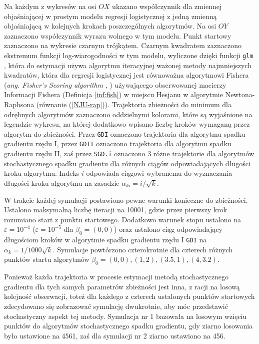 Na każdym z wykresów na osi $OX$ ukazano współczynnik dla zmiennej objaśniającej w prostym modelu regresji logistycznej z jedną zmienną objaśniającą w kolejnych krokach poszczególnych algorytmów. Na osi $OY$ zaznaczono współczynnik wyrazu wolnego w tym modelu. Punkt startowy zaznaczono na wykresie czarnym trójkątem. Czarnym kwadratem zaznaczono ekstremum funkcji log-wiarogodności w tym modelu, wyliczone dzięki funkcji \texttt{glm} \cite{glmglm}, która do estymacji używa algorytmu iteracyjnej ważonej metody najmniejszych kwadratów, która dla regresji logistycznej jest równoważna algorytmowi Fishera (\textit{ang. Fisher's Scoring algorithm} \cite{scoring1}, \cite{scoring2}) używającego obserwowanej macierzy Informacji Fishera (Definicja \ref{inf:fish}) w miejscu Hesjanu w algorytmie Newtona-Raphsona (równanie (\ref{NJU-rap})). Trajektoria zbieżności do minimum dla odrębnych algorytmów zaznaczono oddzielnymi kolorami, które są wyjaśnione na legendzie wykresu, na której dodatkowo wpisano liczbę kroków wymaganą przez algorytm do zbieżności. Przez \texttt{GDI} oznaczono trajektoria dla algorytmu spadku gradientu rzędu I, przez \texttt{GDII} oznaczono trajektoria dla algorytmu spadku gradientu rzędu II, zaś przez \texttt{SGD.i} oznaczono 3 różne trajektorie dla algorytmów stochastycznego spadku gradientu dla różnych ciągów odpowiadających długości kroku algorytmu. Indeks $i$ odpowiada ciągowi wybranemu do wyznaczania długości kroku algorytmu na zasadzie $\alpha_{ki} = i/\sqrt{k}$.

W trakcie każdej symulacji postawiono pewne warunki konieczne do zbieżności. Ustalono maksymalną liczbę iteracji na 10001, gdzie przez pierwszy krok rozumiano start z punktu startowego. Dodatkowo warunek stopu ustalono na $\varepsilon=10^{-4}$ ($\varepsilon=10^{-5}$ dla $\beta_0 = (0,0)$) oraz ustalono ciąg odpowiadający długościom kroków w algorytmie spadku gradientu rzędu I \texttt{GDI} na $\alpha_{k} = 1/1000\sqrt{k}$. Symulacje powtórzono czterokrotnie dla czterech różnych punktów startu algorytmów $\beta_0 = (0,0), (1,2), (3.5,1), (4,3.2).$

Ponieważ każda trajektoria w procesie estymacji metodą stochastycznego gradientu dla tych samych parametrów zbieżności jest inna, z racji na losową kolejność obserwacji, toteż dla każdego z czterech ustalonych punktów startowych zdecydowano się zobrazować symulację dwukrotnie, aby móc przedstawić stochastyczny aspekt tej metody. Symulacja nr 1 bazowała na losowym wzięciu punktów do algorytmów stochastycznego spadku gradientu, gdy ziarno losowania było ustawione na 4561, zaś dla symulacji nr 2 ziarno ustawiono na 456.

